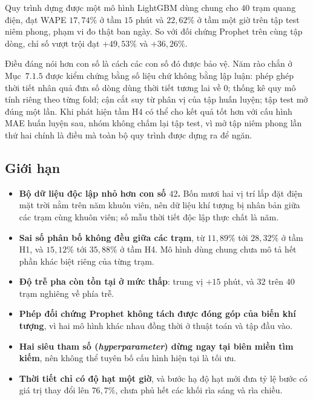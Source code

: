 \documentclass[12pt, a4paper]{report}
\begin{document}
Quy trình dựng được một mô hình LightGBM dùng chung cho $40$ trạm quang điện, đạt WAPE
$17{,}74\%$ ở tầm $15$ phút và $22{,}62\%$ ở tầm một giờ trên tập test niêm phong, phạm vi đo
thật ban ngày. So với đối chứng Prophet trên cùng tập dòng, chỉ số vượt trội đạt $+49{,}53\%$
và $+36{,}26\%$.

Điều đáng nói hơn con số là cách các con số đó được bảo vệ. Năm rào chắn ở Mục~$7.1.5$ được kiểm
chứng bằng số liệu chứ không bằng lập luận: phép ghép thời tiết nhân quả đưa số dòng dùng thời
tiết tương lai về $0$; thống kê quy mô tính riêng theo từng fold; cận cắt suy từ phân vị của
tập huấn luyện; tập test mở đúng một lần. Khi phát hiện tầm H4 có thể cho kết quả tốt hơn với
cấu hình MAE huấn luyện sau, nhóm không chấm lại tập test, vì mở tập niêm phong lần thứ hai
chính là điều mà toàn bộ quy trình được dựng ra để ngăn.

\FloatBarrier
\subsection{Giới hạn}

\begin{itemize}
    \item \textbf{Bộ dữ liệu độc lập nhỏ hơn con số $42$.} Bốn mươi hai vị trí lắp đặt điện mặt trời nằm trên
    năm khuôn viên, nên dữ liệu khí tượng bị nhân bản giữa các trạm cùng khuôn viên; số mẫu
    thời tiết độc lập thực chất là năm.
    \item \textbf{Sai số phân bố không đều giữa các trạm}, từ $11{,}89\%$ tới $28{,}32\%$ ở
    tầm H1, và $15{,}12\%$ tới $35{,}88\%$ ở tầm H4. Mô hình dùng chung chưa mô tả hết phần khác
    biệt riêng của từng trạm.
    \item \textbf{Độ trễ pha còn tồn tại ở mức thấp}: trung vị $+15$ phút, và $32$ trên $40$
    trạm nghiêng về phía trễ.
    \item \textbf{Phép đối chứng Prophet không tách được đóng góp của biến khí tượng}, vì hai
    mô hình khác nhau đồng thời ở thuật toán và tập đầu vào.
    \item \textbf{Hai siêu tham số (\textit{hyperparameter}) dừng ngay tại biên miền tìm kiếm}, nên không thể tuyên bố
    cấu hình hiện tại là tối ưu.
    \item \textbf{Thời tiết chỉ có độ hạt một giờ}, và bước hạ độ hạt mới đưa tỷ lệ
    bước có giá trị thay đổi lên $76{,}7\%$, chưa phủ hết các khối rìa sáng và rìa chiều.
\end{itemize}

\FloatBarrier
\end{document}
